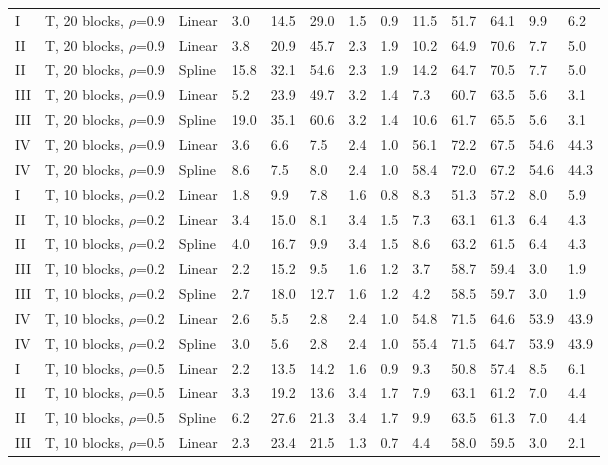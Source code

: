 \documentclass{article}\usepackage[]{graphicx}\usepackage[]{color}
\begin{document}
\begin{table}[ht]
\begin{tabular}{lll|lllll|lllll}
   \hline
I & T, 20 blocks, $\rho$=0.9 & Linear & 3.0 & 14.5 & 29.0 & 1.5 & 0.9 & 11.5 & 51.7 & 64.1 & 9.9 & 6.2 \\ 
  II & T, 20 blocks, $\rho$=0.9 & Linear & 3.8 & 20.9 & 45.7 & 2.3 & 1.9 & 10.2 & 64.9 & 70.6 & 7.7 & 5.0 \\ 
  II & T, 20 blocks, $\rho$=0.9 & Spline & 15.8 & 32.1 & 54.6 & 2.3 & 1.9 & 14.2 & 64.7 & 70.5 & 7.7 & 5.0 \\ 
  III & T, 20 blocks, $\rho$=0.9 & Linear & 5.2 & 23.9 & 49.7 & 3.2 & 1.4 & 7.3 & 60.7 & 63.5 & 5.6 & 3.1 \\ 
  III & T, 20 blocks, $\rho$=0.9 & Spline & 19.0 & 35.1 & 60.6 & 3.2 & 1.4 & 10.6 & 61.7 & 65.5 & 5.6 & 3.1 \\ 
  IV & T, 20 blocks, $\rho$=0.9 & Linear & 3.6 & 6.6 & 7.5 & 2.4 & 1.0 & 56.1 & 72.2 & 67.5 & 54.6 & 44.3 \\ 
  IV & T, 20 blocks, $\rho$=0.9 & Spline & 8.6 & 7.5 & 8.0 & 2.4 & 1.0 & 58.4 & 72.0 & 67.2 & 54.6 & 44.3 \\ 
   \hline
I & T, 10 blocks, $\rho$=0.2 & Linear & 1.8 & 9.9 & 7.8 & 1.6 & 0.8 & 8.3 & 51.3 & 57.2 & 8.0 & 5.9 \\ 
  II & T, 10 blocks, $\rho$=0.2 & Linear & 3.4 & 15.0 & 8.1 & 3.4 & 1.5 & 7.3 & 63.1 & 61.3 & 6.4 & 4.3 \\ 
  II & T, 10 blocks, $\rho$=0.2 & Spline & 4.0 & 16.7 & 9.9 & 3.4 & 1.5 & 8.6 & 63.2 & 61.5 & 6.4 & 4.3 \\ 
  III & T, 10 blocks, $\rho$=0.2 & Linear & 2.2 & 15.2 & 9.5 & 1.6 & 1.2 & 3.7 & 58.7 & 59.4 & 3.0 & 1.9 \\ 
  III & T, 10 blocks, $\rho$=0.2 & Spline & 2.7 & 18.0 & 12.7 & 1.6 & 1.2 & 4.2 & 58.5 & 59.7 & 3.0 & 1.9 \\ 
  IV & T, 10 blocks, $\rho$=0.2 & Linear & 2.6 & 5.5 & 2.8 & 2.4 & 1.0 & 54.8 & 71.5 & 64.6 & 53.9 & 43.9 \\ 
  IV & T, 10 blocks, $\rho$=0.2 & Spline & 3.0 & 5.6 & 2.8 & 2.4 & 1.0 & 55.4 & 71.5 & 64.7 & 53.9 & 43.9 \\ 
   \hline
I & T, 10 blocks, $\rho$=0.5 & Linear & 2.2 & 13.5 & 14.2 & 1.6 & 0.9 & 9.3 & 50.8 & 57.4 & 8.5 & 6.1 \\ 
  II & T, 10 blocks, $\rho$=0.5 & Linear & 3.3 & 19.2 & 13.6 & 3.4 & 1.7 & 7.9 & 63.1 & 61.2 & 7.0 & 4.4 \\ 
  II & T, 10 blocks, $\rho$=0.5 & Spline & 6.2 & 27.6 & 21.3 & 3.4 & 1.7 & 9.9 & 63.5 & 61.3 & 7.0 & 4.4 \\ 
  III & T, 10 blocks, $\rho$=0.5 & Linear & 2.3 & 23.4 & 21.5 & 1.3 & 0.7 & 4.4 & 58.0 & 59.5 & 3.0 & 2.1 \\ 

\end{tabular}
\end{table}
\end{document}
